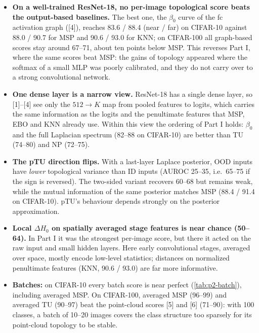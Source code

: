 \begin{itemize}
  \item \textbf{On a well-trained ResNet-18, no per-image topological score beats the output-based
  baselines.} The best one, the $\beta_0$ curve of the fc activation graph ([4]), reaches 83.6 / 88.4
  (near / far) on CIFAR-10 against 88.0 / 90.7 for MSP and 90.6 / 93.0 for KNN; on CIFAR-100 all
  graph-based scores stay around 67--71, about ten points below MSP. This reverses Part I, where
  the same scores beat MSP: the gains of topology appeared where the softmax of a small MLP was
  poorly calibrated, and they do not carry over to a strong convolutional network.
  \item \textbf{One dense layer is a narrow view.} ResNet-18 has a single dense layer, so [1]--[4]
  see only the $512\to K$ map from pooled features to logits, which carries the same information as
  the logits and the penultimate features that MSP, EBO and KNN already use. Within this view the
  ordering of Part I holds: $\beta_0$ and the full Laplacian spectrum (82--88 on CIFAR-10) are better
  than TU (74--80) and NP (72--75).
  \item \textbf{The pTU direction flips.} With a last-layer Laplace posterior, OOD inputs have
  \emph{lower} topological variance than ID inputs (AUROC 25--35, i.e.\ 65--75 if the sign is
  reversed). The two-sided variant recovers 60--68 but remains weak, while the mutual information
  of the same posterior matches MSP (88.4 / 91.4 on CIFAR-10). pTU's behaviour depends strongly on
  the posterior approximation.
  \item \textbf{Local $\Delta H_0$ on spatially averaged stage features is near chance (50--64).}
  In Part I it was the strongest per-image score, but there it acted on the raw input and small
  hidden layers. Here early convolutional stages, averaged over space, mostly encode low-level
  statistics; distances on normalized penultimate features (KNN, 90.6 / 93.0) are far more
  informative.
  \item \textbf{Batches:} on CIFAR-10 every batch score is near perfect (\cref{tab:p2-batch}),
  including averaged MSP. On CIFAR-100, averaged MSP (96--99) and averaged TU (90--97) beat the
  point-cloud scores [5] and [6] (71--90): with 100 classes, a batch of 10--20 images covers the
  class structure too sparsely for its point-cloud topology to be stable.
\end{itemize}
